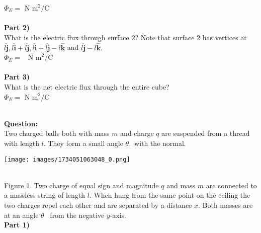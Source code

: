 \documentclass[addpoints,12pt, margin-left=35px]{exam}
\begin{document}
$ \Phi_E = $  \underline{\hspace{3cm}}  $\text{N m}^2 \text{/C}$ \\

\\

\textbf{Part 2)}\\

What is the electric flux through surface 2? Note that surface 2 has vertices at $l \mathbf{\hat{j}}, l\mathbf{\hat{i}} + l\mathbf{\hat{j}}, l \mathbf{\hat{i}} + l \mathbf{\hat{j}} - l \mathbf{\hat{k}}$ and $l\mathbf{\hat{j}} - l \mathbf{\hat{k}}.$\\

$ \Phi_E = $  \underline{\hspace{3cm}}  $\text{N m}^2 \text{/C}$ \\

\\

\textbf{Part 3)}\\

What is the net electric flux through the entire cube?\\

$ \Phi_E = $  \underline{\hspace{3cm}}  $\text{N m}^2 \text{/C}$ \\

\\

\newpage

\textbf{Question:}\\

Two charged balls both with mass $m$ and charge $q$ are suspended from a thread with length $l.$ They form a small angle $\theta,$ with the normal.\\

\begin{center}
\texttt{[image: images/1734051063048\_0.png]}
\end{center}\\

Figure 1. Two charge of equal sign and magnitude $q$ and mass $m$ are connected to a massless string of length $l$. When hung from the same point on the ceiling the two charges repel each other and are separated by a distance $x$. Both masses are at an angle $\theta$  from the negative $y$-axis.\\

\textbf{Part 1)}\\
\end{document}
